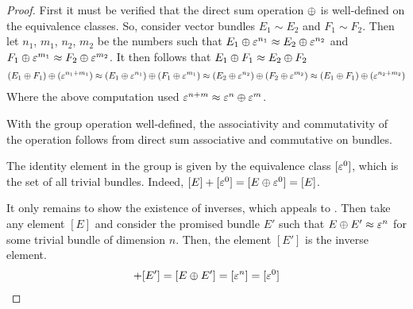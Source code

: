 \documentclass[../../sean_thesis.tex]{subfiles}
\begin{document}
	\begin{proof}
		First it must be verified that the direct sum operation $\oplus$ is well-defined on the equivalence classes. So, consider vector bundles $E_1 \sim E_2$ and $F_1 \sim F_2$. Then let $n_1$, $m_1$, $n_2$, $m_2$ be the numbers such that $E_1 \oplus \varepsilon^{n_1} \approx E_2 \oplus \varepsilon^{n_2}$ and $F_1 \oplus \varepsilon^{m_1} \approx F_2 \oplus \varepsilon^{m_2}$. It then follows that $E_1 \oplus F_1 \approx E_2 \oplus F_2$
		\begin{align*}
			(E_1 \oplus F_1) \oplus (\varepsilon^{n_1+m_1})
			\approx (E_1 \oplus \varepsilon^{n_1}) \oplus (F_1 \oplus \varepsilon^{m_1})	
			\approx (E_2 \oplus \varepsilon^{n_2}) \oplus (F_2 \oplus \varepsilon^{m_2})
			\approx (E_1 \oplus F_1) \oplus (\varepsilon^{n_2+m_2})	
		\end{align*}
		Where the above computation used $\varepsilon^{n+m} \approx \varepsilon^{n} \oplus \varepsilon^{m}$.
		
		With the group operation well-defined, the associativity and commutativity of the operation follows from direct sum associative and commutative on bundles.
		
		The identity element in the group is given by the equivalence class $[\varepsilon^{0}]$, which is the set of all trivial bundles. Indeed, $[E] + [\varepsilon^{0}] = [E \oplus \varepsilon^{0}] = [E]$.
		
		It only remains to show the existence of inverses, which appeals to . Then take any element $[E]$ and consider the promised bundle $E'$ such that $E \oplus E' \approx \varepsilon^{n}$ for some trivial bundle of dimension $n$. Then, the element $[E']$ is the inverse element.
		\begin{align*}
			[E] + [E'] = [E \op E'] = [\tbund{n}] = [\tbund{0}]
		\end{align*} 
	\end{proof}
\end{document}
